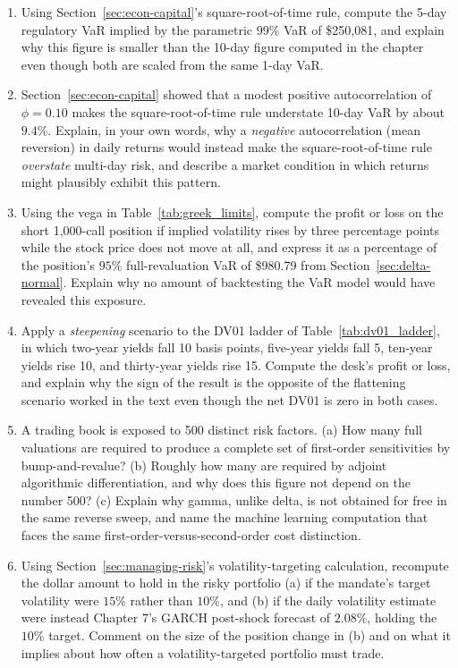 \documentclass[../ai_in_finance]{subfiles}
\begin{document}
\begin{enumerate}
    \item Using Section~\ref{sec:econ-capital}'s square-root-of-time rule, compute the 5-day regulatory VaR implied by the parametric 99\% VaR of \$250,081, and explain why this figure is smaller than the 10-day figure computed in the chapter even though both are scaled from the same 1-day VaR.
    \item Section~\ref{sec:econ-capital} showed that a modest positive autocorrelation of $\phi=0.10$ makes the square-root-of-time rule understate 10-day VaR by about $9.4\%$. Explain, in your own words, why a \emph{negative} autocorrelation (mean reversion) in daily returns would instead make the square-root-of-time rule \emph{overstate} multi-day risk, and describe a market condition in which returns might plausibly exhibit this pattern.
    \item Using the vega in Table~\ref{tab:greek_limits}, compute the profit or loss on the short 1,000-call position if implied volatility rises by three percentage points while the stock price does not move at all, and express it as a percentage of the position's $95\%$ full-revaluation VaR of \$980.79 from Section~\ref{sec:delta-normal}. Explain why no amount of backtesting the VaR model would have revealed this exposure.
    \item Apply a \emph{steepening} scenario to the DV01 ladder of Table~\ref{tab:dv01_ladder}, in which two-year yields fall 10 basis points, five-year yields fall 5, ten-year yields rise 10, and thirty-year yields rise 15. Compute the desk's profit or loss, and explain why the sign of the result is the opposite of the flattening scenario worked in the text even though the net DV01 is zero in both cases.
    \item A trading book is exposed to 500 distinct risk factors. (a) How many full valuations are required to produce a complete set of first-order sensitivities by bump-and-revalue? (b) Roughly how many are required by adjoint algorithmic differentiation, and why does this figure not depend on the number 500? (c) Explain why gamma, unlike delta, is not obtained for free in the same reverse sweep, and name the machine learning computation that faces the same first-order-versus-second-order cost distinction.
    \item Using Section~\ref{sec:managing-risk}'s volatility-targeting calculation, recompute the dollar amount to hold in the risky portfolio (a) if the mandate's target volatility were $15\%$ rather than $10\%$, and (b) if the daily volatility estimate were instead Chapter 7's GARCH post-shock forecast of $2.08\%$, holding the $10\%$ target. Comment on the size of the position change in (b) and on what it implies about how often a volatility-targeted portfolio must trade.

\end{enumerate}
\end{document}
